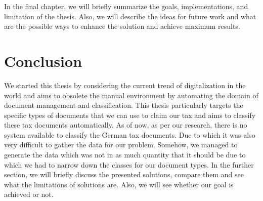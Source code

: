 \par
In the final chapter, we will briefly summarize the goals, implementations, and limitation of the thesis. Also, we will describe the ideas for future work and what are the possible ways to enhance the solution and achieve maximum results.
\section{Conclusion}
We started this thesis by considering the current trend of digitalization in the world and aims to obsolete the manual environment by automating the domain of document management and classification. This thesis particularly targets the specific types of documents that we can use to claim our tax and aims to classify these tax documents automatically. As of now, as per our research, there is no system available to classify the German tax documents. Due to which it was also very difficult to gather the data for our problem. Somehow, we managed to generate the data which was not in as much quantity that it should be due to which we had to narrow down the classes for our document types. In the further section, we will briefly discuss the presented solutions, compare them and see what the limitations of solutions are. Also, we will see whether our goal is achieved or not.
